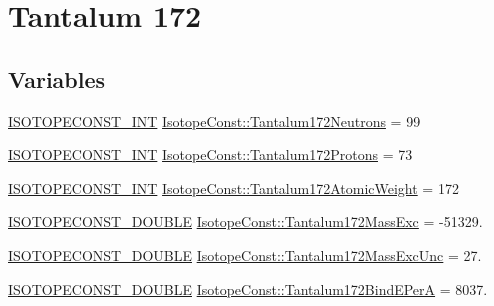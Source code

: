 \hypertarget{group___isotope_const-_tantalum-_ta172}{}\section{Tantalum 172}
\label{group___isotope_const-_tantalum-_ta172}
\subsection*{Variables}
\begin{DoxyCompactItemize}
\item 
\mbox{\hyperlink{group___isotope_const-_macros_ga5f18360b3e99483a35c32d789e62621c}{I\+S\+O\+T\+O\+P\+E\+C\+O\+N\+S\+T\+\_\+\+I\+NT}} \mbox{\hyperlink{group___isotope_const-_tantalum-_ta172_ga1140d1641c387d1ebefc5ca7d75c5ceb}{Isotope\+Const\+::\+Tantalum172\+Neutrons}} = 99
\item 
\mbox{\hyperlink{group___isotope_const-_macros_ga5f18360b3e99483a35c32d789e62621c}{I\+S\+O\+T\+O\+P\+E\+C\+O\+N\+S\+T\+\_\+\+I\+NT}} \mbox{\hyperlink{group___isotope_const-_tantalum-_ta172_gaf356fe7dfb07527bd32e665b8d3eae1d}{Isotope\+Const\+::\+Tantalum172\+Protons}} = 73
\item 
\mbox{\hyperlink{group___isotope_const-_macros_ga5f18360b3e99483a35c32d789e62621c}{I\+S\+O\+T\+O\+P\+E\+C\+O\+N\+S\+T\+\_\+\+I\+NT}} \mbox{\hyperlink{group___isotope_const-_tantalum-_ta172_ga4bb68f2abf72e0086eb7d1440550393d}{Isotope\+Const\+::\+Tantalum172\+Atomic\+Weight}} = 172
\item 
\mbox{\hyperlink{group___isotope_const-_macros_ga8f45a7272ce02c0b4c65c44636ed719a}{I\+S\+O\+T\+O\+P\+E\+C\+O\+N\+S\+T\+\_\+\+D\+O\+U\+B\+LE}} \mbox{\hyperlink{group___isotope_const-_tantalum-_ta172_gac387326fd8971314ba6f462edabc3537}{Isotope\+Const\+::\+Tantalum172\+Mass\+Exc}} = -\/51329.
\item 
\mbox{\hyperlink{group___isotope_const-_macros_ga8f45a7272ce02c0b4c65c44636ed719a}{I\+S\+O\+T\+O\+P\+E\+C\+O\+N\+S\+T\+\_\+\+D\+O\+U\+B\+LE}} \mbox{\hyperlink{group___isotope_const-_tantalum-_ta172_ga008a7ab1fb43b6c85cb9cf0f6f24b793}{Isotope\+Const\+::\+Tantalum172\+Mass\+Exc\+Unc}} = 27.
\item 
\mbox{\hyperlink{group___isotope_const-_macros_ga8f45a7272ce02c0b4c65c44636ed719a}{I\+S\+O\+T\+O\+P\+E\+C\+O\+N\+S\+T\+\_\+\+D\+O\+U\+B\+LE}} \mbox{\hyperlink{group___isotope_const-_tantalum-_ta172_ga51275a165036904b8f6c3391784df208}{Isotope\+Const\+::\+Tantalum172\+Bind\+E\+PerA}} = 8037.
\item 

\end{DoxyCompactItemize}
